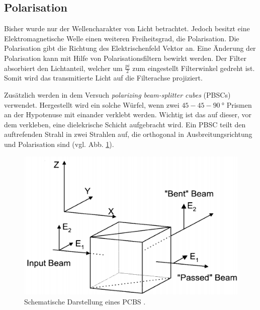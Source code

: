 \subsection{Polarisation}
Bisher wurde nur der Wellencharakter von Licht betrachtet. Jedoch besitzt eine
Elektromagnetische Welle einen weiteren Freiheitsgrad, die Polarisation.
Die Polarisation gibt die Richtung des Elektrischenfeld Vektor an.
Eine Änderung der Polarisation kann mit Hilfe von Polarisationsfiltern bewirkt werden.
Der Filter absorbiert den Lichtanteil, welcher um $\frac{pi}{2}$ zum eingestellt Filterwinkel
gedreht ist. Somit wird das transmitierte Licht auf die Filterachse projiziert.

Zusätzlich werden in dem Versuch \emph{polarizing beam-splitter cubes} (PBSCs) verwendet.
Hergestellt wird ein solche Würfel, wenn zwei $45-45-\SI{90}{\degree}$ Prismen
an der Hypotenuse mit einander verklebt werden. Wichtig ist das auf dieser, vor dem verkleben,
eine dielekrische Schicht aufgebracht wird. Ein PBSC teilt den auftrefenden Strahl
in zwei Strahlen auf, die orthogonal in Ausbreitungsrichtung und Polarisation
sind (vgl. Abb. \ref{fig:pbsc}).
\begin{figure}
\centering
\includegraphics[width=0.7\linewidth]{./content/images/pbsc.png}
\caption{Schematische Darstellung eines PCBS \cite{anleitung64}.}
\label{fig:pbsc}
\end{figure}

